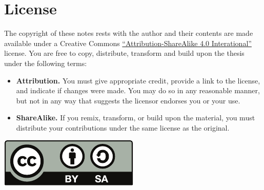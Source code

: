\chapter*{License}%
\label{cha:license}

The copyright of these notes rests with the author and
their contents are made available under a Creative Commons
\href{https://creativecommons.org/licenses/by-sa/4.0/}{``Attribution-ShareAlike 4.0 Interational''}
license.
You are free to copy, distribute, transform and build upon the thesis under the following terms:
\begin{itemize}
    \item \textbf{Attribution.}
    You must give appropriate credit, provide a link to the license, and indicate if changes were made.
    You may do so in any reasonable manner, but not in any way that suggests the licensor endorses you or your use.
    \item \textbf{ShareAlike.} If you remix, transform, or build upon the material,
        you must distribute your contributions under the same license as the original.
\end{itemize}

\vspace{1cm}
\hfill \includegraphics[scale=.7]{figures/cc-by-sa.pdf}

